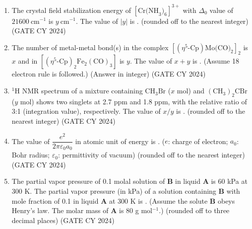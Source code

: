 \documentclass[12pt]{article}
\begin{document}
\begin{enumerate}
\item The crystal field stabilization energy of $[\text{Cr(NH}_3\text{)}_6]^{3+}$ with $\Delta_0$ value of $21600~\text{cm}^{-1}$ is $y~\text{cm}^{-1}$. The value of $|y|$ is \underline{\hspace{2cm}}.  
(rounded off to the nearest integer)  
\hfill (GATE CY 2024)

\item The number of metal-metal bond(s) in the complex $[(\eta^5\text{-Cp})\text{Mo(CO)}_2]_2$ is $x$ and in $[(\eta^5\text{-Cp})_2\text{Fe}_2(\text{CO})_3]$ is $y$. The value of $x+y$ is \underline{\hspace{2cm}}.  
(Assume 18 electron rule is followed.)  
(Answer in integer)  
\hfill (GATE CY 2024)

\item $^1\text{H}$ NMR spectrum of a mixture containing $\text{CH}_3\text{Br}$ ($x$ mol) and $(\text{CH}_3)_2\text{CBr}$ ($y$ mol) shows two singlets at 2.7 ppm and 1.8 ppm, with the relative ratio of 3:1 (integration value), respectively. The value of $x/y$ is \underline{\hspace{2cm}}.  
(rounded off to the nearest integer)  
\hfill (GATE CY 2024)

\item The value of $\dfrac{e^2}{2 \pi \varepsilon_0 a_0}$ in atomic unit of energy is \underline{\hspace{2cm}}.  
($e$: charge of electron; $a_0$: Bohr radius; $\varepsilon_0$: permittivity of vacuum)  
(rounded off to the nearest integer)  
\hfill (GATE CY 2024)

\item The partial vapor pressure of 0.1 molal solution of \textbf{B} in liquid \textbf{A} is 60 kPa at 300 K. The partial vapor pressure (in kPa) of a solution containing \textbf{B} with mole fraction of 0.1 in liquid \textbf{A} at 300 K is \underline{\hspace{2cm}}.  
(Assume the solute \textbf{B} obeys Henry’s law. The molar mass of \textbf{A} is 80 g mol$^{-1}$.)  
(rounded off to three decimal places)  
\hfill (GATE CY 2024)


\end{enumerate}
\end{document}
